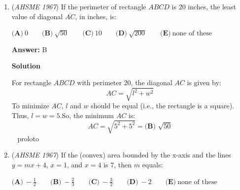 \begin{enumerate}
\textbf{Solution}

Given the equation:
 \[\frac{a}{10^x-1}+\frac{b}{10^x+2}=\frac{2 \cdot 10^x+3}{(10^x-1)(10^x+2)}\]

 Let's simplify by letting $y = 10^x$. The equation becomes:
 \[\frac{a}{y-1}+\frac{b}{y+2}=\frac{2y+3}{(y-1)(y+2)}\]

 Multiplying each term by the common denominator $(y-1)(y+2)$, we obtain:
 \[a(y+2) + b(y-1) = 2y+3\]

 For the equation to be an identity, the coefficients of like terms on both sides must be equal. Equating the coefficients of $y$ and the constant terms, we get the system of equations:

 
 \begin{align*} a+b &= 2 \quad \text{(from coefficients of } y \text{)} \\ 2a - b &= 3 \quad \text{(from constant terms)} \end{align*}


 Solving this system, we find:
 \[a = \frac{5}{3} \quad \text{and} \quad b = \frac{1}{3}\]

 Thus, the difference is:
 \[a-b = \boxed{\textbf{(A) } \frac{4}{3}}\]



	\item (\textit{AHSME 1967}) If the perimeter of rectangle $ABCD$ is $20$ inches, the least value of diagonal $\overline{AC}$, in inches, is:


 $\textbf{(A)}\ 0\qquad \textbf{(B)}\ \sqrt{50}\qquad \textbf{(C)}\ 10\qquad \textbf{(D)}\ \sqrt{200}\qquad \textbf{(E)}\ \text{none of these}$

 \textbf{Answer: }B



\textbf{Solution}

For rectangle $ABCD$ with perimeter 20, the diagonal $AC$ is given by:
 \[AC = \sqrt{l^2 + w^2}\]To minimize $AC$, $l$ and $w$ should be equal (i.e., the rectangle is a square). Thus, $l = w = 5$.So, the minimum $AC$ is:
 \[AC = \sqrt{5^2 + 5^2} = \boxed{\textbf{(B) } \sqrt{50}}\]~ proloto

 


	\item (\textit{AHSME 1967}) If the (convex) area bounded by the x-axis and the lines $y=mx+4$, $x=1$, and $x=4$ is $7$, then $m$ equals:


 $\textbf{(A)}\ -\frac{1}{2}\qquad \textbf{(B)}\ -\frac{2}{3}\qquad \textbf{(C)}\ -\frac{3}{2} \qquad \textbf{(D)}\ -2 \qquad \textbf{(E)}\ \text{none of these}$


\end{enumerate}
